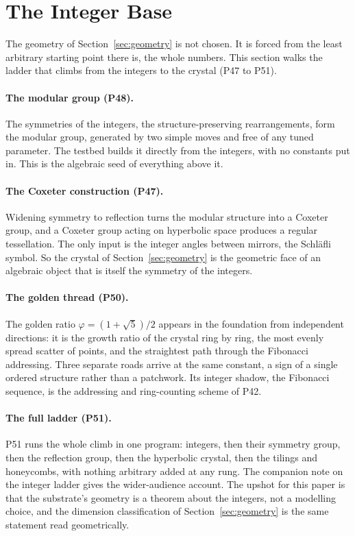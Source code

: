 \section{The Integer Base}
\label{sec:base}

The geometry of Section~\ref{sec:geometry} is not chosen. It is forced from the least arbitrary
starting point there is, the whole numbers. This section walks the ladder that climbs from the
integers to the crystal (P47 to P51).

\paragraph{The modular group (P48).}
The symmetries of the integers, the structure-preserving rearrangements, form the modular group,
generated by two simple moves and free of any tuned parameter. The testbed builds it directly from
the integers, with no constants put in. This is the algebraic seed of everything above it.

\paragraph{The Coxeter construction (P47).}
Widening symmetry to reflection turns the modular structure into a Coxeter group, and a Coxeter
group acting on hyperbolic space produces a regular tessellation. The only input is the integer
angles between mirrors, the Schl\"afli symbol. So the crystal of Section~\ref{sec:geometry} is the
geometric face of an algebraic object that is itself the symmetry of the integers.

\paragraph{The golden thread (P50).}
The golden ratio $\varphi = (1+\sqrt 5)/2$ appears in the foundation from independent directions:
it is the growth ratio of the crystal ring by ring, the most evenly spread scatter of points, and
the straightest path through the Fibonacci addressing. Three separate roads arrive at the same
constant, a sign of a single ordered structure rather than a patchwork. Its integer shadow, the
Fibonacci sequence, is the addressing and ring-counting scheme of P42.

\paragraph{The full ladder (P51).}
P51 runs the whole climb in one program: integers, then their symmetry group, then the reflection
group, then the hyperbolic crystal, then the tilings and honeycombs, with nothing arbitrary added
at any rung. The companion note on the integer ladder gives the wider-audience account. The upshot
for this paper is that the substrate's geometry is a theorem about the integers, not a modelling
choice, and the dimension classification of Section~\ref{sec:geometry} is the same statement read
geometrically.


